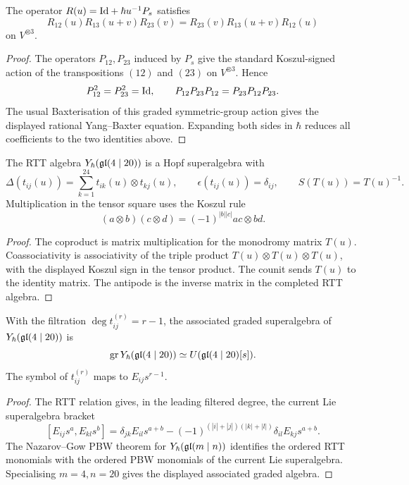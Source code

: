 \begin{lemma}
\label{lem:gl420-rtt-ybe}
The operator \(R(u)=\mathrm{Id}+\hbar u^{-1}P_s\) satisfies
\[
  R_{12}(u)R_{13}(u+v)R_{23}(v)
  =
  R_{23}(v)R_{13}(u+v)R_{12}(u)
\]
on \(V^{\otimes 3}\).
\end{lemma}

\begin{proof}
The operators \(P_{12},P_{23}\) induced by \(P_s\) give the standard
Koszul-signed action of the transpositions \((12)\) and \((23)\) on
\(V^{\otimes 3}\).  Hence
\[
  P_{12}^2=P_{23}^2=\mathrm{Id},
  \qquad
  P_{12}P_{23}P_{12}=P_{23}P_{12}P_{23}.
\]
The usual Baxterisation of this graded symmetric-group action gives
the displayed rational Yang--Baxter equation.  Expanding both sides in
\(\hbar\) reduces all coefficients to the two identities above.
\end{proof}

\begin{proposition}
\label{prop:gl420-hopf}
The RTT algebra \(Y_\hbar(\mathfrak{gl}(4\mid 20))\) is a Hopf superalgebra with
\[
  \Delta(t_{ij}(u))=\sum_{k=1}^{24}t_{ik}(u)\otimes t_{kj}(u),
  \qquad
  \epsilon(t_{ij}(u))=\delta_{ij},
  \qquad
  S(T(u))=T(u)^{-1}.
\]
Multiplication in the tensor square uses the Koszul rule
\[
  (a\otimes b)(c\otimes d)=(-1)^{|b||c|}ac\otimes bd .
\]
\end{proposition}

\begin{proof}
The coproduct is matrix multiplication for the monodromy matrix
\(T(u)\).  Coassociativity is associativity of the triple product
\(T(u)\otimes T(u)\otimes T(u)\), with the displayed Koszul sign in
the tensor product.  The counit sends \(T(u)\) to the identity matrix.
The antipode is the inverse matrix in the completed RTT algebra.
\end{proof}

\begin{proposition}
\label{prop:gl420-pbw}
With the filtration \(\deg t_{ij}^{(r)}=r-1\), the associated graded
superalgebra of \(Y_\hbar(\mathfrak{gl}(4\mid 20))\) is
\[
  \operatorname{gr}Y_\hbar(\mathfrak{gl}(4\mid 20))
  \simeq
  U(\mathfrak{gl}(4\mid 20)[s]).
\]
The symbol of \(t_{ij}^{(r)}\) maps to \(E_{ij}s^{r-1}\).
\end{proposition}

\begin{proof}
The RTT relation gives, in the leading filtered degree, the current
Lie superalgebra bracket
\[
  [E_{ij}s^a,E_{kl}s^b]
  =
  \delta_{jk}E_{il}s^{a+b}
  -
  (-1)^{(|i|+|j|)(|k|+|l|)}
  \delta_{il}E_{kj}s^{a+b}.
\]
The Nazarov--Gow PBW theorem for \(Y_\hbar(\mathfrak{gl}(m\mid n))\) identifies
the ordered RTT monomials with the ordered PBW monomials of the current
Lie superalgebra.  Specialising \(m=4,n=20\) gives the displayed
associated graded algebra.
\end{proof}


